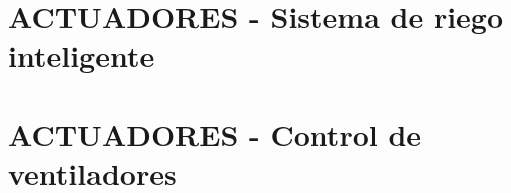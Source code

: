 

\section{ACTUADORES - Sistema de riego inteligente}



\section{ACTUADORES - Control de ventiladores}

